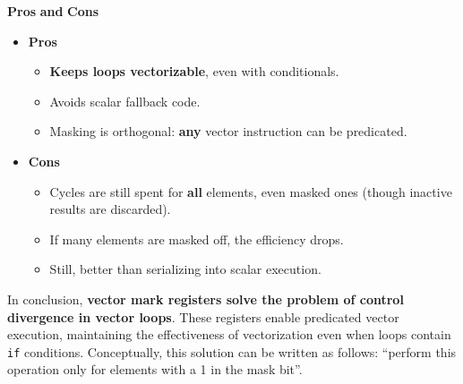 \highspace
\begin{flushleft}
    \textcolor{Green3}{ \textbf{Pros}} \textbf{and} \textcolor{Red2}{ \textbf{Cons}}
\end{flushleft}
\begin{itemize}
    \item[\textcolor{Green3}{\faIcon{check-circle}}] \textcolor{Green3}{\textbf{Pros}}
    \begin{itemize}
        \item[\textcolor{Green3}{\faIcon{check}}] \textbf{Keeps loops vectorizable}, even with conditionals.
        \item[\textcolor{Green3}{\faIcon{check}}] Avoids scalar fallback code.
        \item[\textcolor{Green3}{\faIcon{check}}] Masking is orthogonal: \textbf{any} vector instruction can be predicated.
    \end{itemize}
    \item[\textcolor{Red2}{\faIcon{times-circle}}] \textcolor{Red2}{\textbf{Cons}}
    \begin{itemize}
        \item[\textcolor{Red2}{\faIcon{times}}] Cycles are still spent for \textbf{all} elements, even masked ones (though inactive results are discarded).
        \item[\textcolor{Red2}{\faIcon{times}}] If many elements are masked off, the efficiency drops.
        \item[\textcolor{Red2}{\faIcon{times}}] Still, better than serializing into scalar execution.
    \end{itemize}
\end{itemize}
In conclusion, \textbf{vector mark registers solve the problem of control divergence in vector loops}. These registers enable predicated vector execution, maintaining the effectiveness of vectorization even when loops contain \texttt{if} conditions. Conceptually, this solution can be written as follows: ``perform this operation only for elements with a 1 in the mask bit''.